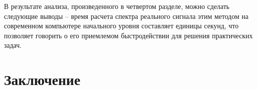 В результате анализа, произведенного в четвертом разделе, можно сделать следующие выводы -- время расчета спектра реального сигнала этим методом на современном компьютере начального уровня составляет единицы секунд, что позволяет говорить о его приемлемом быстродействии для решения практических задач.	

\section*{Заключение}

%
%
%
